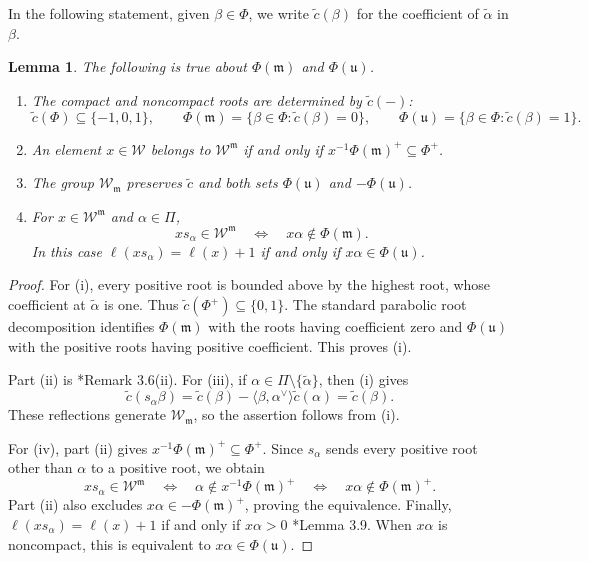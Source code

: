\documentclass[12pt]{amsart}
\newtheorem{lemma}[theorem]{Lemma}
\theoremstyle{definition}
\numberwithin{equation}{section}
\newcommand{\m}{\mathfrak m}
\newcommand{\W}{\mathscr W}
\begin{document}
In the following statement, given $\beta\in \Phi$, we write $\tilde{c}(\beta)$ for the coefficient of $\widetilde{\alpha}$ in $\beta$.



\begin{lemma}\label{lem:am-root-conventions}
The following is true about $\Phi(\m)$ and $\Phi(\mathfrak{u})$.
\begin{enumerate}
\renewcommand{\labelenumi}{(\roman{enumi})}
\item The compact and noncompact roots are determined by $\tilde{c}(-)$:
\begin{equation}\label{eq:root-coefficients}
 \tilde{c}(\Phi)\subseteq\{-1,0,1\},\qquad
 \Phi(\m)=\{\beta\in\Phi:\tilde{c}(\beta)=0\},\qquad
 \Phi(\mathfrak{u})=\{\beta\in\Phi:\tilde{c}(\beta)=1\}.
\end{equation}
\item An element $x\in\W$ belongs to $\W^{\m}$ if and only if
$x^{-1}\Phi(\m)^+\subseteq\Phi^+$.
\item The group $\W_{\m}$ preserves $\tilde{c}$ and both sets
$\Phi(\mathfrak{u})$ and $-\Phi(\mathfrak{u})$.
\item For $x\in\W^{\m}$ and $\alpha\in\Pi$,
\[
 xs_\alpha\in\W^{\m}
 \quad\Longleftrightarrow\quad
 x\alpha\notin\Phi(\m).
\]
In this case $\ell(xs_\alpha)=\ell(x)+1$ if and only if
$x\alpha\in\Phi(\mathfrak{u})$.
\end{enumerate}
\end{lemma}
\begin{proof}
For \textup{(i)}, every positive root is bounded above by
the highest root, whose coefficient at $\widetilde{\alpha}$
is one. Thus $\tilde{c}(\Phi^+)\subseteq\{0,1\}$.
The standard parabolic root decomposition identifies
$\Phi(\m)$ with the roots having coefficient zero and
$\Phi(\mathfrak{u})$ with the positive roots having positive
coefficient. This proves \textup{(i)}.

Part \textup{(ii)} is \cite{EHP}*{Remark 3.6(ii)}. For \textup{(iii)}, if
$\alpha\in\Pi\setminus\{\widetilde{\alpha}\}$, then (i) gives
\[
\tilde{c}(s_\alpha\beta)
=\tilde{c}(\beta)-\langle\beta,\alpha^\vee\rangle \tilde{c}(\alpha)
=\tilde{c}(\beta).
\]
These reflections generate $\W_{\m}$, so the assertion
follows from \textup{(i)}.

For \textup{(iv)}, part \textup{(ii)} gives
$x^{-1}\Phi(\m)^+\subseteq\Phi^+$.
Since $s_\alpha$ sends every positive root other than
$\alpha$ to a positive root, we obtain
\[
xs_\alpha\in\W^{\m}
\quad\Longleftrightarrow\quad
\alpha\notin x^{-1}\Phi(\m)^+
\quad\Longleftrightarrow\quad
x\alpha\notin\Phi(\m)^+.
\]
Part \textup{(ii)} also excludes
$x\alpha\in-\Phi(\m)^+$, proving the equivalence.
Finally, $\ell(xs_\alpha)=\ell(x)+1$ if and only if
$x\alpha>0$ \cite{EHP}*{Lemma 3.9}. When $x\alpha$ is
noncompact, this is equivalent to $x\alpha\in\Phi(\mathfrak{u})$.
\end{proof} 
\end{document}
